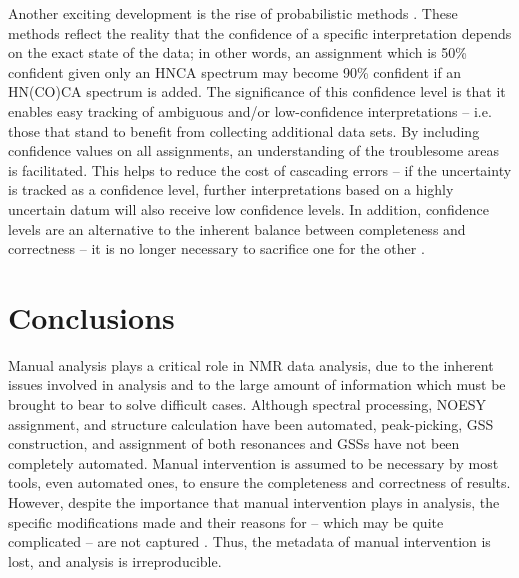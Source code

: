 Another exciting development is the rise of probabilistic methods 
\cite{saga, pine}.  These methods reflect the reality that the 
confidence of a specific interpretation depends on the exact state of the 
data; in other words, an assignment which is 50\% confident given only an 
HNCA spectrum may become 90\% confident if an HN(CO)CA spectrum is added.  
The significance of this confidence level is that it enables easy tracking 
of ambiguous and/or low-confidence interpretations -- i.e. those that stand 
to benefit from collecting additional data sets.  By including confidence 
values on all assignments, an understanding of the troublesome areas is 
facilitated.  This helps to reduce the cost of cascading errors -- if the 
uncertainty is tracked as a confidence level, further interpretations based 
on a highly uncertain datum will also receive low confidence levels.  In 
addition, confidence levels are an alternative to the inherent balance 
between completeness and correctness -- it is no longer necessary to 
sacrifice one for the other \cite{autoassign2001, pine}.


\section{Conclusions}

Manual analysis plays a critical role in NMR data analysis, due to the inherent 
issues involved in analysis and to the large amount of information which must 
be brought to bear to solve difficult cases.  Although spectral processing, 
NOESY assignment, and structure calculation have been automated, peak-picking, 
GSS construction, and assignment of both resonances and GSSs have not been 
completely automated.  Manual intervention is assumed to be necessary by 
most tools, even automated ones, to ensure the completeness and correctness 
of results.  However, despite the importance that manual intervention plays 
in analysis, the specific modifications made and their reasons for -- 
which may be quite complicated -- are not captured \cite{guntert2009automated}.  
Thus, the metadata of manual intervention is lost, and analysis is 
irreproducible.

